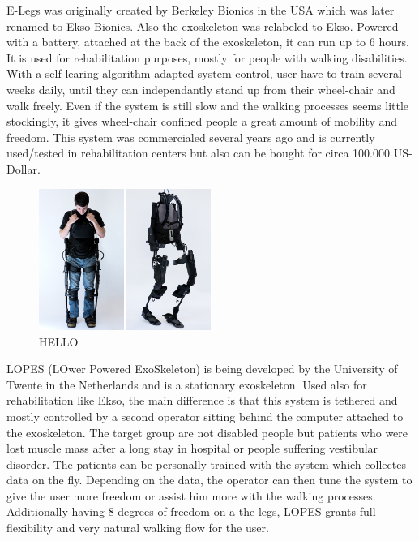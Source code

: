 \documentclass[letterpaper, 10 pt, conference]{ieeeconf}  %
\begin{document}
E-Legs was originally created by Berkeley Bionics in the USA which was later renamed to Ekso Bionics. Also the exoskeleton was relabeled to Ekso. Powered with a battery, attached at the back of the exoskeleton, it can run up to 6 hours. It is used for rehabilitation purposes, mostly for people with walking disabilities. With a self-learing algorithm adapted system control, user have to train several weeks daily, until they can independantly stand up from their wheel-chair and walk freely. Even if the system is still slow and the walking processes seems little stockingly, it gives wheel-chair confined people a great amount of mobility and freedom. This system was commercialed several years ago and is currently used/tested in rehabilitation centers but also can be bought for circa 100.000 US-Dollar. \newline


\begin{figure}[H]
  \centering
    \includegraphics[width=0.5\textwidth]{img/elegs}
  \caption{HELLO}
\end{figure}


LOPES (LOwer Powered ExoSkeleton) is being developed by the University of Twente in the Netherlands and is a stationary exoskeleton. Used also for rehabilitation like Ekso, the main difference is that this system is tethered and mostly controlled by a second operator sitting behind the computer attached to the exoskeleton. The target group are not disabled people but patients who were lost muscle mass after a long stay in hospital or people suffering vestibular disorder. The patients can be personally trained with the system which collectes data on the fly. Depending on the data, the operator can then tune the system to give the user more freedom or assist him more with the walking processes. Additionally having 8 degrees of freedom on a the legs, LOPES grants full flexibility and very natural walking flow for the user.\newpage
\end{document}
